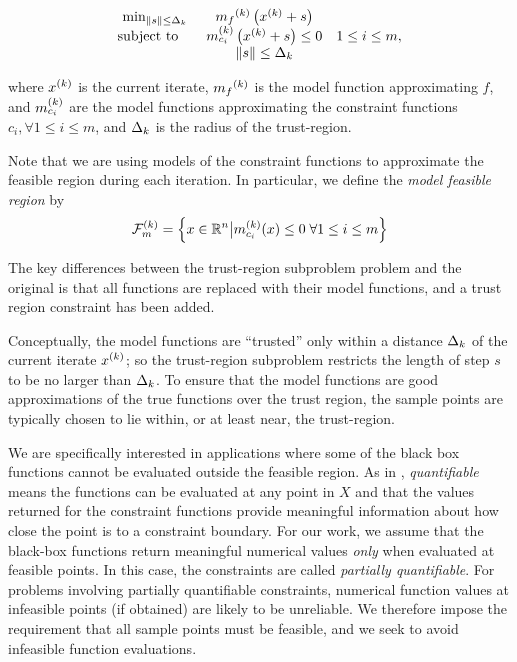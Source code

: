 \begin{align*}
\begin{array}{ccl} \min_{\|s\| \le \Delta_k}
 & {{m}_f}^{(k)} \left(x^{(k)}+s\right) \\
\mbox{subject to} \quad & {{m}^{(k)}_{c_i}}\left(x^{(k)} + s\right) \le 0 & 1 \le i \le m, \\
& \|s\| \le \Delta_k \\
\end{array}
\end{align*}

where $x^{(k)}$ is the current iterate, ${{m}_f}^{(k)}$ is the model function approximating $f$, 
and ${{m}^{(k)}_{c_i}}$ are the model functions approximating the constraint functions $c_i, \forall 1 \le i \le m$, and $\Delta_k$ is the radius of the trust-region.

Note that we are using models of the constraint functions to approximate the feasible region during each iteration.  In particular, we define the {\em model feasible region} by
\begin{align}
{\mathcal F_m^{(k)}} = \left\{x \in \mathbb R^n \big| {{m}^{(k)}_{c_i}}(x) \le 0 \; \forall 1 \le i \le m \right\} \label{define_feasiblek}
\end{align}

The key differences between the trust-region subproblem problem and the original is that all functions are replaced with their model functions, and a trust region constraint has been added.

Conceptually, the model functions are ``trusted'' only within a distance $ \Delta_k $ of the current iterate $x^{(k)}$; so the trust-region subproblem restricts the length of step $s$ to be no larger than $\Delta_k$.
To ensure that the model functions are good approximations of the true functions over the trust region, the sample points are typically chosen to lie within, or at least near, the trust-region.

We are specifically interested in applications where some of the black box functions cannot be evaluated outside the feasible region.      As in \cite{digabel2015taxonomy}, {\em quantifiable} means the functions can be evaluated at any point in $X$ and that the values returned for the constraint functions provide meaningful information about how close the point is to a constraint boundary.
For our work, we assume that the black-box functions return meaningful numerical values \emph{only} when evaluated at feasible points.    In this case,  the constraints are called {\em partially quantifiable}.    
For problems involving partially quantifiable constraints,  numerical function values at infeasible points (if obtained) are likely to be unreliable.   We therefore impose 
 the requirement that all sample points must be feasible, and we seek to avoid infeasible function evaluations.

